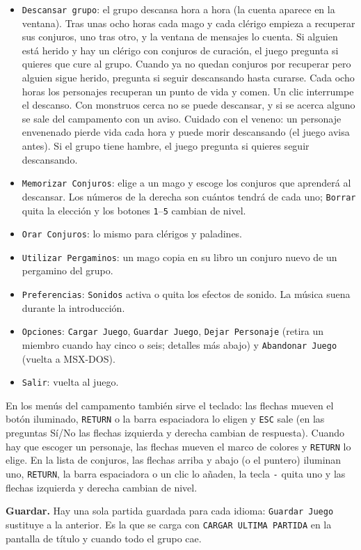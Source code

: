 \begin{itemize}
\item \texttt{Descansar grupo}: el grupo descansa hora a hora (la cuenta aparece en la ventana). Tras unas ocho horas cada mago y cada cl\'erigo empieza a recuperar sus conjuros, uno tras otro, y la ventana de mensajes lo cuenta. Si alguien est\'a herido y hay un cl\'erigo con conjuros de curaci\'on, el juego pregunta si quieres que cure al grupo. Cuando ya no quedan conjuros por recuperar pero alguien sigue herido, pregunta si seguir descansando hasta curarse. Cada ocho horas los personajes recuperan un punto de vida y comen. Un clic interrumpe el descanso. Con monstruos cerca no se puede descansar, y si se acerca alguno se sale del campamento con un aviso. Cuidado con el veneno: un personaje envenenado pierde vida cada hora y puede morir descansando (el juego avisa antes). Si el grupo tiene hambre, el juego pregunta si quieres seguir descansando.
\item \texttt{Memorizar Conjuros}: elige a un mago y escoge los conjuros que aprender\'a al descansar. Los n\'umeros de la derecha son cu\'antos tendr\'a de cada uno; \texttt{Borrar} quita la elecci\'on y los botones \texttt{1}--\texttt{5} cambian de nivel.
\item \texttt{Orar Conjuros}: lo mismo para cl\'erigos y paladines.
\item \texttt{Utilizar Pergaminos}: un mago copia en su libro un conjuro nuevo de un pergamino del grupo.
\item \texttt{Preferencias}: \texttt{Sonidos} activa o quita los efectos de sonido. La música suena durante la introducción.
\item \texttt{Opciones}: \texttt{Cargar Juego}, \texttt{Guardar Juego}, \texttt{Dejar Personaje} (retira un miembro cuando hay cinco o seis; detalles más abajo) y \texttt{Abandonar Juego} (vuelta a MSX-DOS).
\item \texttt{Salir}: vuelta al juego.
\end{itemize}

En los men\'us del campamento tambi\'en sirve el teclado: las flechas mueven el bot\'on iluminado, \texttt{RETURN} o la barra espaciadora lo eligen y \texttt{ESC} sale (en las preguntas S\'i/No las flechas izquierda y derecha cambian de respuesta). Cuando hay que escoger un personaje, las flechas mueven el marco de colores y \texttt{RETURN} lo elige. En la lista de conjuros, las flechas arriba y abajo (o el puntero) iluminan uno, \texttt{RETURN}, la barra espaciadora o un clic lo a\~naden, la tecla \texttt{-} quita uno y las flechas izquierda y derecha cambian de nivel.

\textbf{Guardar.} Hay una sola partida guardada para cada idioma: \texttt{Guardar Juego} sustituye a la anterior. Es la que se carga con \texttt{CARGAR ULTIMA PARTIDA} en la pantalla de t\'itulo y cuando todo el grupo cae.






